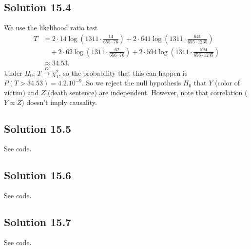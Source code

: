 \subsection*{Solution 15.4}

We use the likelihood ratio test
\begin{equation*}
    \begin{split}
        T &= 2 \cdot 14 \log\left(1311 \cdot \frac{14}{655 \cdot 76} \right)
            + 2 \cdot 641 \log\left(1311 \cdot \frac{641}{655 \cdot 1235} \right) \\
            &\quad + 2 \cdot 62 \log\left(1311 \cdot \frac{62}{656 \cdot 76} \right)
            + 2 \cdot 594 \log\left(1311 \cdot \frac{594}{656 \cdot 1235} \right) \\
        &\approx 34.53.
    \end{split}
\end{equation*}
Under $H_0$: $T \xrightarrow{D} \chi^2_1$, so the probability that this can happen is $P(T > 34.53) = 4.2.10^{-9}$.
So we reject the null hypothesis $H_0$ that $Y$ (color of victim) and $Z$ (death sentence) are independent.
However, note that correlation ($Y \propto Z$) doesn't imply causality.


\subsection*{Solution 15.5}

See code.


\subsection*{Solution 15.6}

See code.


\subsection*{Solution 15.7}

See code.
